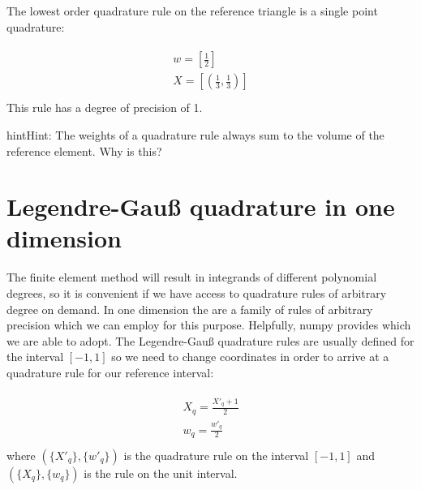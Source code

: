 \documentclass{book}
\begin{document}
The lowest order quadrature rule on the reference triangle is a single point
quadrature:

\label{\detokenize{1_quadrature:equation-1_quadrature:2}}\begin{align}\label{equation:1_quadrature:1_quadrature:2}\!\begin{aligned}
w = \left[ \frac{1}{2} \right]\\
X = \left[ \left(\frac{1}{3}, \frac{1}{3}  \right) \right]\\
\end{aligned}\end{align}
This rule has a degree of precision of 1.

\begin{sphinxadmonition}{hint}{Hint:}
The weights of a quadrature rule always sum to the volume of the
reference element. Why is this?
\end{sphinxadmonition}


\section{Legendre-Gauß quadrature in one dimension}
\label{\detokenize{1_quadrature:legendre-gausz-quadrature-in-one-dimension}}
The finite element method will result in integrands of different
polynomial degrees, so it is convenient if we have access to
quadrature rules of arbitrary degree on demand. In one dimension the
 are a
family of rules of arbitrary precision which we can employ for this
purpose. Helpfully, numpy provides 
which we are able to adopt. The Legendre-Gauß quadrature rules are
usually defined for the interval \([-1, 1]\) so we need to change
coordinates in order to arrive at a quadrature rule for our reference
interval:

\label{\detokenize{1_quadrature:equation-1_quadrature:3}}\begin{align}\label{equation:1_quadrature:1_quadrature:3}\!\begin{aligned}
X_q = \frac{X'_q + 1}{2}\\
w_q = \frac{w'_q}{2}\\
\end{aligned}\end{align}
where \((\{X'_q\}, \{w'_q\})\) is the quadrature rule on the interval
\([-1, 1]\) and \((\{X_q\}, \{w_q\})\) is the rule on the unit interval.
\end{document}
